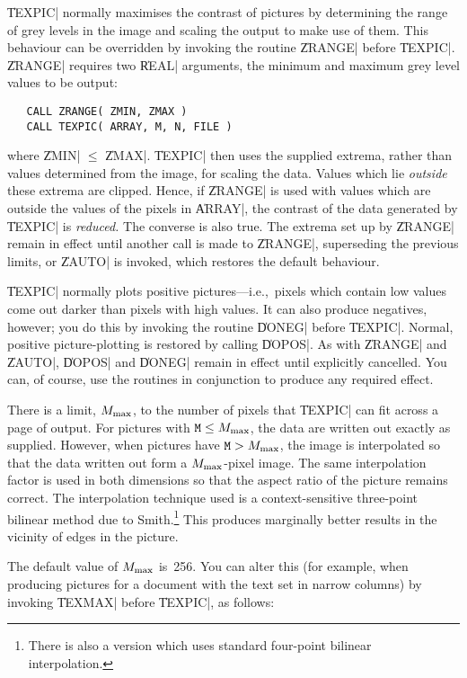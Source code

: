 \|TEXPIC| normally maximises the contrast of pictures by determining the range
of grey levels in the image and scaling the output to make use of them. This
behaviour can be overridden by invoking the routine \|ZRANGE| before \|TEXPIC|.
\|ZRANGE| requires two \|REAL| arguments, the minimum and maximum grey level
values to be output: 

\begin{verbatim}
   CALL ZRANGE( ZMIN, ZMAX )
   CALL TEXPIC( ARRAY, M, N, FILE )
\end{verbatim}

\noindent where \|ZMIN| $\le$ \|ZMAX|.
\|TEXPIC| then uses the supplied extrema, rather than values
determined from the image, for scaling the data. Values which lie {\em
outside\/} these extrema are clipped. Hence, if \|ZRANGE| is used with values
which are outside the values of the pixels in \|ARRAY|, the contrast of the
data generated by \|TEXPIC| is {\em reduced.\/} The converse is also true. The
extrema set up by \|ZRANGE| remain in effect until another call is made to
\|ZRANGE|, superseding the previous limits, or \|ZAUTO| is invoked, which
restores the default behaviour. 

\|TEXPIC| normally plots positive pictures---i.e.,\ pixels which contain
low values come out darker than pixels with high values. It can also produce
negatives, however; you do this by invoking the routine \|DONEG| before
\|TEXPIC|. Normal, positive picture-plotting is restored by calling \|DOPOS|.
As with \|ZRANGE| and \|ZAUTO|, \|DOPOS| and \|DONEG| remain in effect until
explicitly cancelled.
You can, of course, use the routines in conjunction to produce any
required effect.

There is a limit, $M_{\hbox{\scriptsize max}}$, to the number of pixels that \|TEXPIC| can fit
across a page of output. For
pictures with $\|M| \le \mmax$, the data are written out exactly as supplied.
However, when pictures have $\|M| > \mmax$, the image is interpolated so
that the data written out form a $M_{\hbox{\scriptsize max}}$-pixel image.
The same interpolation factor is used in both dimensions so that the aspect
ratio of the picture remains correct. The interpolation technique used is
a context-sensitive three-point bilinear method due to {\sc
Smith}.\footnote{There is also a version which uses standard four-point
bilinear interpolation.} This produces marginally better results in the
vicinity of edges in the picture.

The default value of $M_{\hbox{\scriptsize max}}$ is~256. You can alter this (for example, when
producing pictures for a document with the text set in narrow columns) by
invoking \|TEXMAX| before \|TEXPIC|, as follows:

